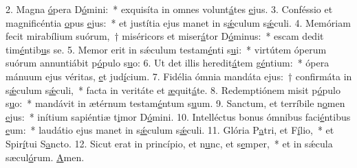 2. Magna \uline{ó}pera D\uline{ó}mini:~* exquisíta in omnes volunt\uline{á}tes \uline{e}jus.
3. Conféssio et magnificéntia \uline{o}pus \uline{e}jus:~* et justítia ejus manet in s\uline{ǽ}culum s\uline{ǽ}culi.
4. Memóriam fecit mirabílium suórum,~† miséricors et miser\uline{á}tor D\uline{ó}minus:~* escam dedit tim\uline{é}ntib\uline{u}s se.
5. Memor erit in sǽculum testam\uline{é}nti s\uline{u}i:~* virtútem óperum suórum annuntiábit p\uline{ó}pulo s\uline{u}o:
6. Ut det illis heredit\uline{á}tem g\uline{é}ntium:~* ópera mánuum ejus véritas, \uline{e}t jud\uline{í}cium.
7. Fidélia ómnia mandáta ejus:~† confirmáta in s\uline{ǽ}culum s\uline{ǽ}culi,~* facta in veritáte et \uline{æ}quit\uline{á}te.
8. Redemptiónem misit p\uline{ó}pulo s\uline{u}o:~* mandávit in ætérnum testam\uline{é}ntum s\uline{u}um.
9. Sanctum, et terríbile n\uline{o}men \uline{e}jus:~* inítium sapiéntiæ t\uline{i}mor D\uline{ó}mini.
10. Intelléctus bonus ómnibus faci\uline{é}ntibus \uline{e}um:~* laudátio ejus manet in s\uline{ǽ}culum s\uline{ǽ}culi.
11. Glória P\uline{a}tri, et F\uline{í}lio,~* et Spir\uline{í}tui S\uline{a}ncto.
12. Sicut erat in princípio, et n\uline{u}nc, et s\uline{e}mper,~* et in sǽcula sæcul\uline{ó}rum. \uline{A}men.
